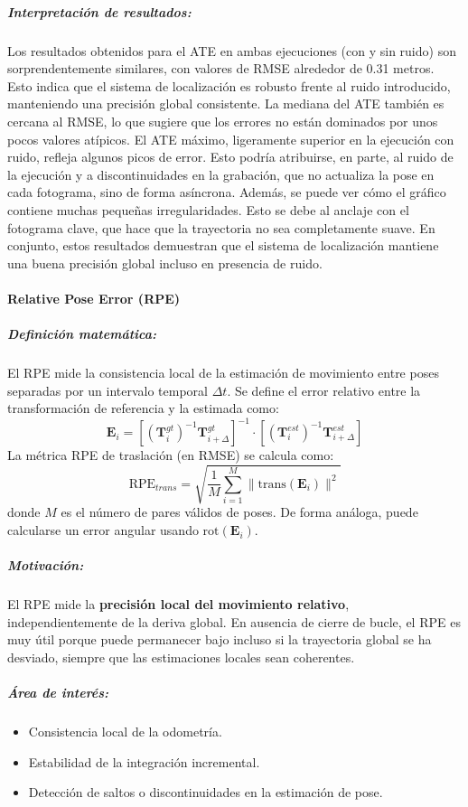 \documentclass[12pt, a4paper, twoside]{article}
\begin{document}
\subparagraph{Interpretación de resultados:}
Los resultados obtenidos para el ATE\cite{Chen2022DELOATE} en ambas ejecuciones (con y sin ruido) son
sorprendentemente similares, con valores de RMSE alrededor de 0.31 metros.
Esto indica que el sistema de localización es robusto frente al ruido introducido,
manteniendo una precisión global consistente.\newline
La mediana del ATE\cite{Chen2022DELOATE} también es cercana al RMSE, lo que sugiere que
los errores no están dominados por unos pocos valores atípicos.
El ATE\cite{Chen2022DELOATE} máximo, ligeramente superior en la ejecución con ruido, refleja
algunos picos de error. Esto podría atribuirse, en parte, al ruido de la ejecución y 
a discontinuidades en la grabación, que no actualiza la pose en cada fotograma, sino
de forma asíncrona.\newline
Además, se puede ver cómo el gráfico contiene muchas pequeñas irregularidades. Esto se 
debe al anclaje con el fotograma clave, que hace que la trayectoria no sea completamente suave.
En conjunto, estos resultados demuestran que el sistema de localización
mantiene una buena precisión global incluso en presencia de ruido.


\paragraph{Relative Pose Error (RPE\cite{Sturm2012RPE})}

\subparagraph{Definición matemática:}
El RPE\cite{Sturm2012RPE} mide la consistencia local de la estimación de movimiento entre poses 
separadas por un intervalo temporal $\Delta t$.
Se define el error relativo entre la transformación de referencia y la estimada como:
\[
\mathbf{E}_i =
\left[
(\mathbf{T}^{gt}_i)^{-1}\mathbf{T}^{gt}_{i+\Delta}
\right]^{-1}
\cdot
\left[
(\mathbf{T}^{est}_i)^{-1}\mathbf{T}^{est}_{i+\Delta}
\right]
\]
La métrica RPE\cite{Sturm2012RPE} de traslación (en RMSE) se calcula como:
\[
\text{RPE}_{trans} =
\sqrt{\frac{1}{M}\sum_{i=1}^{M}
\|\mathrm{trans}(\mathbf{E}_i)\|^2 }
\]
donde $M$ es el número de pares válidos de poses.
De forma análoga, puede calcularse un error angular usando $\mathrm{rot}(\mathbf{E}_i)$.

\subparagraph{Motivación:}
El RPE\cite{Sturm2012RPE} mide la \textbf{precisión local del movimiento relativo}, 
independientemente de la deriva global.
En ausencia de cierre de bucle, el RPE\cite{Sturm2012RPE} es muy útil porque 
puede permanecer bajo incluso si la trayectoria global se ha desviado,
siempre que las estimaciones locales sean coherentes.
\subparagraph{Área de interés:}
\begin{itemize}
  \item Consistencia local de la odometría.
  \item Estabilidad de la integración incremental.
  \item Detección de saltos o discontinuidades en la estimación de pose.
\end{itemize}
\end{document}
